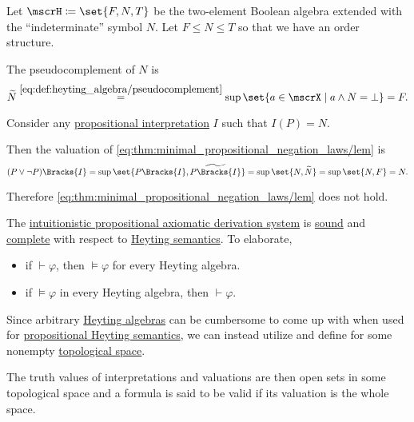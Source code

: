 \begin{example}\label{ex:heyting_semantics_lem_counterexample}
  Let \( \mscrH \coloneqq \set{ F, N, T } \) be the two-element Boolean algebra extended with the \enquote{indeterminate} symbol \( N \). Let \( F \leq N \leq T \) so that we have an order structure.

  The pseudocomplement of \( N \) is
  \begin{equation*}
    \widetilde{N}
    \overset {\eqref{eq:def:heyting_algebra/pseudocomplement}} =
    \sup\set{ a \in \mscrX \given a \wedge N = \bot }
    =
    F.
  \end{equation*}

  Consider any \hyperref[def:propositional_semantics/interpretation]{propositional interpretation} \( I \) such that \( I(P) = N \).

  Then the valuation of \eqref{eq:thm:minimal_propositional_negation_laws/lem} is
  \begin{equation*}
    (P \vee \neg P)\Bracks{I}
    =
    \sup\set{ P\Bracks{I}, \widetilde{P\Bracks{I}} }
    =
    \sup\set{ N, \widetilde{N} }
    =
    \sup\set{ N, F }
    =
    N.
  \end{equation*}

  Therefore \eqref{eq:thm:minimal_propositional_negation_laws/lem} does not hold.
\end{example}

\begin{theorem}\label{thm:intuitionistic_propositional_logic_is_sound_and_complete}
  The \hyperref[def:intuitionistic_propositional_axiomatic_derivation_system]{intuitionistic propositional axiomatic derivation system} is \hyperref[def:derivability_and_satisfiability/soundness]{sound} and \hyperref[def:derivability_and_satisfiability/completeness]{complete} with respect to \hyperref[def:propositional_heyting_semantics]{Heyting semantics}. To elaborate,
  \begin{itemize}
    \item if \( \vdash \varphi \), then \( \vDash \varphi \) for every Heyting algebra.
    \item if \( \vDash \varphi \) in every Heyting algebra, then \( \vdash \varphi \).
  \end{itemize}
\end{theorem}

\begin{definition}\label{def:propositional_topological_semantics}
  Since arbitrary \hyperref[def:heyting_algebra]{Heyting algebras} can be cumbersome to come up with when used for \hyperref[def:propositional_heyting_semantics]{propositional Heyting semantics}, we can instead utilize  and define  for some nonempty \hyperref[def:topological_space]{topological space}.

  The truth values of interpretations and valuations are then open sets in some topological space and a formula is said to be valid if its valuation is the whole space.
\end{definition}

